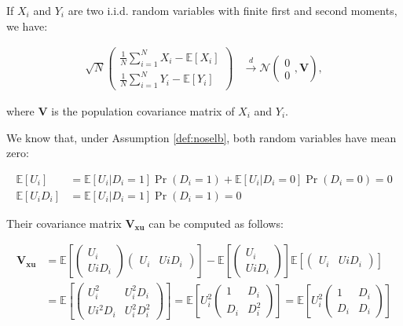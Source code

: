 \documentclass[]{book}
\newcommand{\esp}[1]{\mathbb{E}[ #1 ]}
\theoremstyle{definition}
\theoremstyle{definition}
\theoremstyle{definition}
\theoremstyle{remark}
\begin{document}
If \(X_i\) and \(Y_i\) are two i.i.d. random variables with finite first
and second moments, we have:

\begin{align*}
    \sqrt{N}
  \left(
      \begin{array}{c}  
       \frac{1}{N}\sum_{i=1}^NX_i-\esp{X_i}\\   
       \frac{1}{N}\sum_{i=1}^NY_i-\esp{Y_i}
       \end{array}
     \right) 
      &
  \stackrel{d}{\rightarrow}
  \mathcal{N}
  \left(
    \begin{array}{c}    
    0\\
    0
    \end{array},
  \mathbf{V}
  \right),
\end{align*}

where \(\mathbf{V}\) is the population covariance matrix of \(X_i\) and
\(Y_i\).

We know that, under Assumption \ref{def:noselb}, both random variables
have mean zero:

\begin{align*}
\esp{U_i}& = \esp{U_i|D_i=1}\Pr(D_i=1)+\esp{U_i|D_i=0}\Pr(D_i=0)=0 \\
\esp{U_iD_i}& = \esp{U_i|D_i=1}\Pr(D_i=1)=0
\end{align*}

Their covariance matrix \(\mathbf{V_{xu}}\) can be computed as follows:

\begin{align*}
\mathbf{V_{xu}} & = \esp{\left(\begin{array}{c}  U_i\\  UiD_i\end{array}\right)\left(\begin{array}{cc}  U_i&    UiD_i\end{array}\right)}
                  - \esp{\left(\begin{array}{c} U_i\\   UiD_i\end{array}\right)}\esp{\left(\begin{array}{cc}    U_i&    UiD_i\end{array}\right)}\\
                & = \esp{\left(\begin{array}{cc}    U_i^2 & U_i^2D_i\\  Ui^2D_i & U_i^2D_i^2\end{array}\right)} 
                  = \esp{U_i^2\left(\begin{array}{cc}   1 & D_i\\   D_i & D_i^2\end{array}\right)} 
                  = \esp{U_i^2\left(\begin{array}{cc}   1 & D_i\\   D_i & D_i\end{array}\right)} 
\end{align*}
\end{document}
